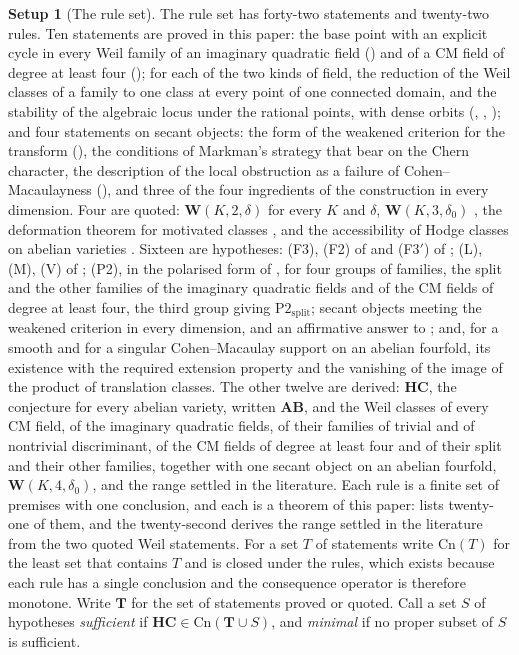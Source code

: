 \documentclass[11pt,reqno]{amsart}
\theoremstyle{plain}
\theoremstyle{definition}
\newtheorem{setupenv}[theorem]{Setup}
\theoremstyle{remark}
\newcommand{\Cn}{\mathrm{Cn}}
\begin{document}
\begin{setupenv}[The rule set]\label{setup:rules}
The rule set has forty-two statements and twenty-two rules. Ten statements
are proved in this paper: the base point with an explicit cycle in every Weil
family of an imaginary quadratic field (\cite[Theorem~15.27]{paperI}) and of a CM
field of degree at least four (\cite[Theorem~17.5]{paperI}); for each of the two
kinds of field, the reduction of the Weil classes of a family to one class at
every point of one connected domain, and the stability of the algebraic locus
under the rational points, with dense orbits (\cite[Section~12]{paperI},
\cite[Proposition~16.7]{paperI}, \cite[Theorem~17.7]{paperI}); and four statements on
secant objects: the form of the weakened criterion for the transform
(\cite[Theorem~4.56]{paperII}), the conditions of Markman's strategy that bear on the
Chern character, the description of the local obstruction as a failure of
Cohen--Macaulayness (\cite[Corollary~4.77]{paperII}), and three of the four
ingredients of the construction in every dimension. Four are quoted:
$\mathbf{W}(K,2,\delta)$ for every $K$ and $\delta$, $\mathbf{W}(K,3,\delta_{0})$
\cite{Mar25a,Mar25b}, the deformation theorem for motivated classes
\cite[Th\'eor\`eme~0.5]{And96b}, and the accessibility of Hodge classes on
abelian varieties \cite[\S5.1, Theorem~3]{Mil20}. Sixteen are hypotheses:
(F3), (F2) of  and (F3$'$) of ;
(L), (M), (V) of ; (P2), in the polarised form of
\cite[Remark~3.6]{paperII}, for four groups of families, the split and the other
families of the imaginary quadratic fields and of the CM fields of degree at
least four, the third group giving $\mathrm{P2}_{\mathrm{split}}$; secant
objects meeting the weakened criterion in every dimension, and an affirmative
answer to \cite[Question~11.4]{Mar25b}; and, for a smooth and for a singular
Cohen--Macaulay support on an abelian fourfold, its existence with the
required extension property and the vanishing of the image of the product of
translation classes. The other twelve are derived: $\mathbf{HC}$, the
conjecture for every abelian variety, written $\mathbf{AB}$, and the Weil
classes of every CM field, of the imaginary quadratic fields, of their
families of trivial and of nontrivial discriminant, of the CM fields of
degree at least four and of their split and their other families, together
with one secant object on an abelian fourfold, $\mathbf{W}(K,4,\delta_{0})$,
and the range settled in the literature. Each rule is a finite set of
premises with one conclusion, and each is a theorem of this paper:
 lists twenty-one of them, and the twenty-second derives the
range settled in the literature from the two quoted Weil statements. For a
set $T$ of statements write $\Cn(T)$ for the least set that contains $T$ and
is closed under the rules, which exists because each rule has a single
conclusion and the consequence operator is therefore monotone. Write
$\mathbf{T}$ for the set of statements proved or quoted. Call a set $S$ of
hypotheses \emph{sufficient} if $\mathbf{HC}\in\Cn(\mathbf{T}\cup S)$, and
\emph{minimal} if no proper subset of $S$ is sufficient.
\end{setupenv}
\end{document}

